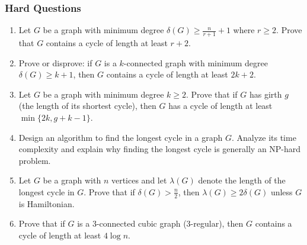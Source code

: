 \documentclass{article}
\theoremstyle{definition}
\begin{document}
\subsubsection{Hard Questions}
\begin{enumerate}[start=15]
\item Let $G$ be a graph with minimum degree $\delta(G) \geq \frac{n}{r+1} + 1$ where $r \geq 2$. Prove that $G$ contains a cycle of length at least $r+2$.

\item Prove or disprove: if $G$ is a $k$-connected graph with minimum degree $\delta(G) \geq k+1$, then $G$ contains a cycle of length at least $2k+2$.

\item Let $G$ be a graph with minimum degree $k \geq 2$. Prove that if $G$ has girth $g$ (the length of its shortest cycle), then $G$ has a cycle of length at least $\min\{2k, g+k-1\}$.

\item Design an algorithm to find the longest cycle in a graph $G$. Analyze its time complexity and explain why finding the longest cycle is generally an NP-hard problem.

\item Let $G$ be a graph with $n$ vertices and let $\lambda(G)$ denote the length of the longest cycle in $G$. Prove that if $\delta(G) > \frac{n}{2}$, then $\lambda(G) \geq 2\delta(G)$ unless $G$ is Hamiltonian.

\item Prove that if $G$ is a 3-connected cubic graph (3-regular), then $G$ contains a cycle of length at least $4\log n$.
\end{enumerate}
\end{document}
